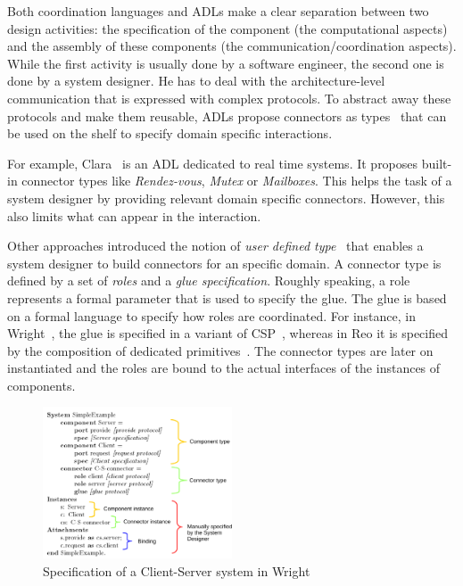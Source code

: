 Both coordination languages and ADLs make a clear separation between two design activities: the specification of the component (\ie the computational aspects) and the assembly of these components (\ie the communication/coordination aspects). While the first activity is usually done by a software engineer, the second one is done by a system designer. He has to deal with the architecture-level communication that is expressed with complex protocols. To abstract away these protocols and make them reusable, ADLs propose connectors as types~\cite{frameadlsbib} that can be used on the shelf to specify domain specific interactions.

For example, Clara~\cite{clarabib} is an ADL dedicated to real time systems. It proposes built-in connector types like \emph{Rendez-vous}, \emph{Mutex} or \emph{Mailboxes}. This helps the task of a system designer by providing relevant domain specific connectors. However, this also limits what can appear in the interaction. 

Other approaches introduced the notion of \emph{user defined type}~\cite{uniconbib,wrightbib,reobib} that enables a system designer to build connectors for an specific domain. A connector type is defined by a set of \emph{roles} and a \emph{glue specification}. Roughly speaking, a role represents a formal parameter that is used to specify the glue. The glue is based on a formal language to specify how roles are coordinated. For instance, in Wright~\cite{wrightbib}, the glue is specified in a variant of CSP~\cite{csphoarebib}, whereas in Reo it is specified by the composition of dedicated primitives~\cite{reobib}. The connector types are later on instantiated and the roles are bound to the actual interfaces of the instances of components. 

\begin{figure}
	\begin{center}
		\includegraphics[width=0.5\textwidth]{background/figs/wrightspec}
		\caption{Specification of a Client-Server system in Wright~\cite{wrightbib}}
		\label{fig:wrightspec}
	\end{center}
\end{figure}

